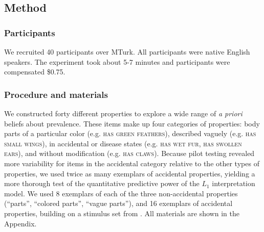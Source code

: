 \documentclass[12pt,letterpaper]{article}
\begin{document}
\subsection*{Method}

\subsubsection*{Participants}

We recruited 40 participants over MTurk.  
All participants were native English speakers. 
The experiment took about 5-7 minutes and participants were compensated \$0.75.

\subsubsection*{Procedure and materials}

We constructed forty different properties to explore a wide range of \emph{a priori} beliefs about prevalence. 
These items make up four categories of properties: body parts of a particular color (e.g. \textsc{has green feathers}), described vaguely (e.g. \textsc{has small wings}), in accidental or disease states (e.g. \textsc{has wet fur}, \textsc{has swollen ears}), and without modification (e.g. \textsc{has claws}).
Because pilot testing revealed more variability for items in the accidental category relative to the other types of properties, we used twice as many exemplars of accidental properties, yielding a more thorough test of the quantitative predictive power of the $L_1$ interpretation model. 
We used 8 exemplars of each of the three non-accidental properties (``parts'', ``colored parts'', ``vague parts''), and 16 exemplars of accidental properties, building on a stimulus set from .
All materials are shown in the Appendix.
\end{document}
